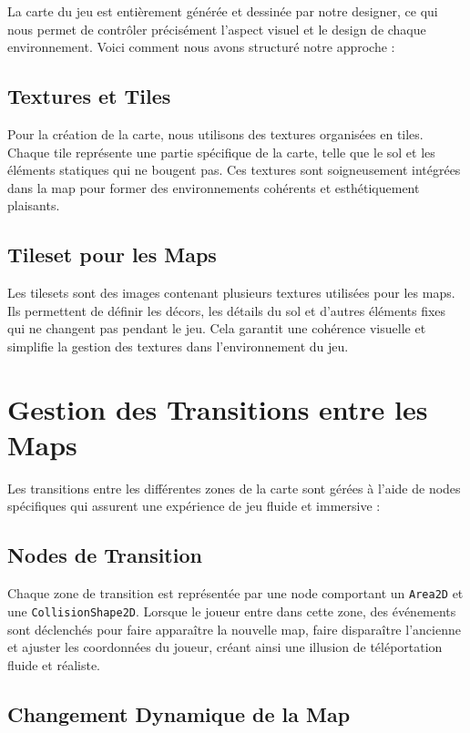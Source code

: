 La carte du jeu est entièrement générée et dessinée par notre designer, ce qui nous permet de contrôler précisément 
l'aspect visuel et le design de chaque environnement.
 Voici comment nous avons structuré notre approche :

\subsection*{Textures et Tiles}

Pour la création de la carte, nous utilisons des textures organisées en tiles. 
Chaque tile représente une partie spécifique de la carte, telle que le sol et les éléments statiques qui ne bougent pas.
 Ces textures sont soigneusement intégrées dans la map pour former des environnements cohérents et esthétiquement plaisants.

\subsection*{Tileset pour les Maps}

Les tilesets sont des images contenant plusieurs textures utilisées pour les maps. Ils permettent de définir les décors,
 les détails du sol et d'autres éléments fixes qui ne changent pas pendant le jeu. Cela garantit une cohérence visuelle et simplifie
  la gestion des textures dans l'environnement du jeu.

\section*{Gestion des Transitions entre les Maps}

Les transitions entre les différentes zones de la carte sont gérées à l'aide de nodes spécifiques qui assurent une expérience de jeu fluide et immersive :

\subsection*{Nodes de Transition}

Chaque zone de transition est représentée par une node comportant un \texttt{Area2D} et une \texttt{CollisionShape2D}.
 Lorsque le joueur entre dans cette zone, des événements sont déclenchés pour faire apparaître la nouvelle map, faire disparaître l'ancienne et ajuster les coordonnées du joueur, créant ainsi une illusion de téléportation fluide et réaliste.

\subsection*{Changement Dynamique de la Map}

